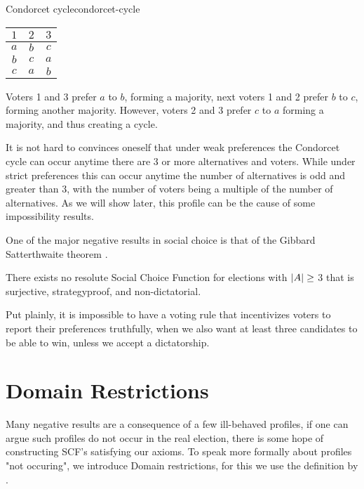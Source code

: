 \begin{example}{Condorcet cycle}{condorcet-cycle}
	\begin{minipage}{0.15\linewidth}
		\begin{tabular}{ccc}
			\toprule
			$1$ & $2$ & $3$  \\
			\midrule
			$a$ & $b$ & $c $ \\
			$b$ & $c$ & $a $ \\
			$c$ & $a$ & $b $ \\
			\bottomrule
		\end{tabular}
	\end{minipage}
	\hspace{0.02\linewidth}
	\begin{minipage}{0.78\linewidth}
		Voters 1 and 3  prefer $a$ to $b$, forming a majority, next voters 1 and 2 prefer $b$ to $c$, forming another majority. However, voters 2 and 3 prefer $c$ to $a$ forming a majority, and thus creating a cycle.
	\end{minipage}
\end{example}

It is not hard to convinces oneself that under weak preferences the Condorcet cycle can occur anytime there are 3 or more alternatives and voters. While under strict preferences this can occur anytime the number of alternatives is odd and greater than 3, with the number of voters being a multiple of the number of alternatives. As we will show later, this profile can be the cause of some impossibility results.

One of the major negative results in social choice is that of the Gibbard Satterthwaite theorem \citep{gibbardManipulationVotingSchemes1973,satterthwaiteStrategyproofnessArrowsConditions1975}.

\begin{theorem}
	\label{thm:gs-thm}
	There exists no resolute Social Choice Function for elections with $|A| \geq$ 3 that is surjective, strategyproof, and non-dictatorial.
\end{theorem}

Put plainly, it is impossible to have a voting rule that incentivizes voters to
report their preferences truthfully, when we also want at least three
candidates to be able to win, unless we accept a dictatorship.

\section{Domain Restrictions}
\label{sec: Domain-res}
Many negative results are a consequence of a few ill-behaved profiles, if one can argue such profiles do not occur in the real election, there is some hope of constructing SCF's satisfying our axioms. To speak more formally about profiles "not occuring", we introduce Domain restrictions, for this we use the definition by \citet{elkindPreferenceRestrictionsComputational2022}.

